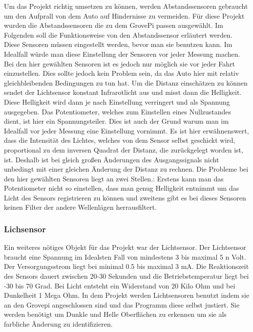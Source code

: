 \documentclass[notitlepage]{report}
\begin{document}
Um das Projekt richtig umsetzen zu k\"{o}nnen, werden Abstandssensoren gebraucht um den Aufprall von dem Auto auf Hindernisse zu vermeiden. F\"{u}r diese Projekt wurden die Abstandssensoren die zu dem GrovePi passen ausgew\"{a}hlt. Im Folgenden soll die Funktionsweise von den Abstandssensor erl\"{a}utert werden.
 Diese Sensoren m\"{u}ssen eingestellt werden, bevor man sie benutzen kann. Im Idealfall w\"{u}rde man diese Einstellung der Sensoren vor jeder Messung machen. Bei den hier gew\"{a}hlten Sensoren ist es jedoch nur m\"{o}glich sie vor jeder Fahrt einzustellen. Dies sollte jedoch kein Problem sein, da das Auto hier mit relativ gleichbleibenden Bedingungen zu tun hat.  
Um die Distanz einsch\"{a}tzen zu k\"{o}nnen sendet der Lichtsensor konstant Infrarotlicht aus und misst dann die Helligkeit. Diese Helligkeit wird dann je nach Einstellung verringert und als Spannung ausgegeben. Das Potentiometer, welches zum Einstellen eines Nullzustandes dient, ist hier ein Spannungsteiler. Dies ist auch der Grund warum man im Idealfall vor jeder Messung eine Einstellung vornimmt.
Es ist hier erw\"{a}hnenswert, dass die Intensit\"{a}t des Lichtes, welches von dem Sensor selbst geschickt wird, proportional zu dem inversen Quadrat der Distanz, die zur\"{u}ckgelegt worden ist, ist. Deshalb ist bei gleich gro{\ss}en \"{A}nderungen des Ausgangssignals nicht unbedingt mit einer gleichen \"{A}nderung der Distanz zu rechnen.  
Die Probleme bei den hier gew\"{a}hlten Sensoren liegt an zwei Stellen.: Erstens kann man das Potentiometer nicht so einstellen, dass man genug Helligkeit entnimmt um das Licht des Sensors registrieren zu k\"{o}nnen und zweitens gibt es bei dieses Sensoren keinen Filter der andere Wellenl\"{a}gen herrausfiltert.


\subsubsection{Lichsensor}

Ein weiteres n\"{o}tiges Objekt f\"{u}r das Projekt war der Lichtsensor. Der Lichtsensor braucht eine Spannung im Idealsten Fall von mindestens 3 bis maximal 5 n Volt. Der Versorgungsstrom liegt bei minimal 0.5 bis maximal 3 mA. Die Reaktionszeit des Sensors dauert zwischen 20-30 Sekunden und die Betriebstemperatur liegt bei -30 bis 70 Grad.  Bei Licht entsteht ein Widerstand von 20 Kilo Ohm und bei Dunkelheit 1 Mega Ohm. In dem Projekt werden Lichtsensoren benutzt indem sie an den Grovepi angeschlossen sind und das Programm diese selbst justiert. Sie werden ben\"{o}tigt um Dunkle und Helle Oberfl\"{a}chen zu erkennen um sie als farbliche \"{A}nderung zu identifizieren. 
\end{document}
